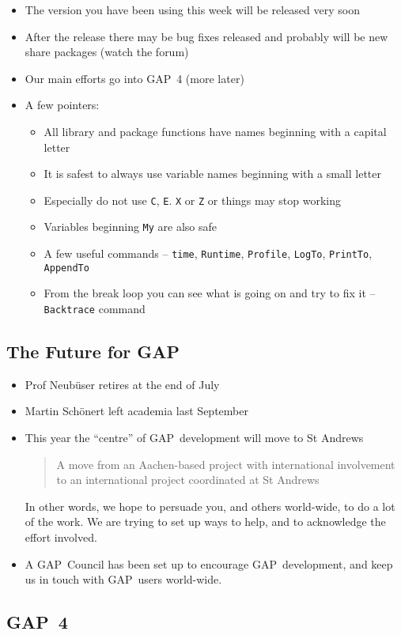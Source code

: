 \documentclass[11pt]{article}
\def\bs{\begin{slide}}
\def\es{\end{slide}}
\def\bi{\begin{itemize}}
\def\ei{\end{itemize}}
\def\GAP{\textsf{GAP}}
\begin{document}
\begin{slide}
\bi
\item The version you have been using this week will be released very
soon
\item After the release there may be bug fixes released and probably
will be new share packages (watch the forum)
\item Our main efforts go into \GAP\ 4 (more later)
\item A few pointers:
\bi
\item All library and package functions have names beginning with a
capital letter
\item It is safest to always use variable names beginning with a small
letter
\item Especially do not use \texttt{C}, \texttt{E}. \texttt{X} or
\texttt{Z} or things may stop working
\item Variables beginning \texttt{My} are also safe
\item A few useful commands -- \texttt{time}, \texttt{Runtime},
\texttt{Profile}, \texttt{LogTo}, \texttt{PrintTo}, \texttt{AppendTo}
\item From the break loop you can see what is going on and try to fix
it -- \texttt{Backtrace} command
\ei
\ei

\es
\bs
\subsection{The Future for \GAP}


\bi
\item Prof Neub\"user retires at the end of July
\item Martin Sch\"onert left academia last September
\item This year the ``centre'' of \GAP\ development will move to St
Andrews

\begin{quote}
A move from an Aachen-based project with international involvement to
an international project coordinated at St Andrews
\end{quote}

In other words, we hope to persuade you, and others world-wide, to do
a lot of the work. We are trying to set up ways to help, and to
acknowledge the effort involved.
\item A \GAP\ Council has been set up to encourage \GAP\ development,
and keep us in touch with \GAP\ users world-wide.
\ei
\es
\bs
\subsection{\GAP\ 4}


\end{slide}
\end{document}
